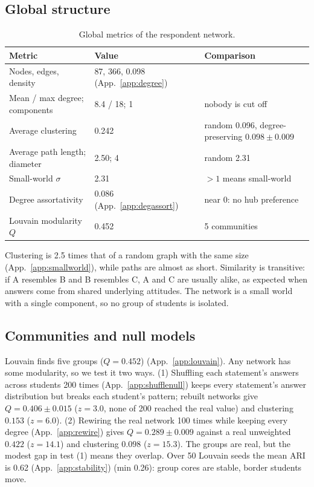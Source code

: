 \documentclass[10pt,a4paper]{article}
\newcommand{\app}[1]{(App.~\ref{app:#1})}\setlength{\columnsep}{14pt}
\begin{document}
\subsection{Global structure}
\begin{table}[H]\centering\small
\begin{tabular}{lll}\toprule
Metric & Value & Comparison\\\midrule
Nodes, edges, density & 87, 366, 0.098 \app{degree} & \\
Mean / max degree; components & 8.4 / 18; 1 & nobody is cut off\\
Average clustering & 0.242 & random 0.096, degree-preserving $0.098\pm0.009$\\
Average path length; diameter & 2.50; 4 & random 2.31\\
Small-world $\sigma$ & 2.31 & $>1$ means small-world\\
Degree assortativity & 0.086 \app{degassort} & near 0: no hub preference\\
Louvain modularity $Q$ & 0.452 & 5 communities\\\bottomrule
\end{tabular}\caption{Global metrics of the respondent network.}\end{table}

Clustering is 2.5 times that of a random graph with the same size \app{smallworld}, while paths are almost as short. Similarity is transitive: if A resembles B and B resembles C, A and C are usually alike, as expected when answers come from shared underlying attitudes. The network is a small world with a single component, so no group of students is isolated.

\subsection{Communities and null models}
Louvain finds five groups ($Q=0.452$) \app{louvain}. Any network has some modularity, so we test it two ways. (1) Shuffling each statement's answers across students 200 times \app{shufflenull} keeps every statement's answer distribution but breaks each student's pattern; rebuilt networks give $Q=0.406\pm0.015$ ($z=3.0$, none of 200 reached the real value) and clustering $0.153$ ($z=6.0$). (2) Rewiring the real network 100 times while keeping every degree \app{rewire} gives $Q=0.289\pm0.009$ against a real unweighted $0.422$ ($z=14.1$) and clustering $0.098$ ($z=15.3$). The groups are real, but the modest gap in test (1) means they overlap. Over 50 Louvain seeds the mean ARI is 0.62 \app{stability} (min 0.26): group cores are stable, border students move.
\end{document}

